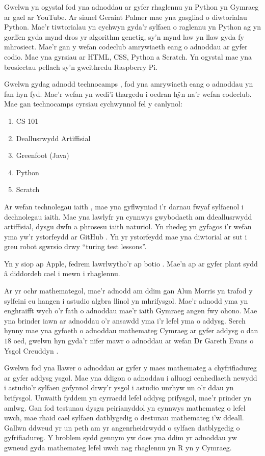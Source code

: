 Gwelwn yn ogystal fod yna adnoddau ar gyfer rhaglennu yn Python yn Gymraeg ar gael ar YouTube. Ar sianel Geraint Palmer \cite{youtube} mae yna gasgliad o diwtorialau Python. Mae'r tiwtorialau yn cychwyn gyda'r sylfaen o raglennu yn Python ag yn gorffen gyda mynd dros yr algorithm genetig, sy'n mynd law yn llaw gyda fy mhrosiect.
Mae'r gan y wefan codeclub amrywiaeth eang o adnoddau ar gyfer codio. Mae yna gyrsiau ar HTML, CSS, Python a Scratch. Yn ogystal mae yna brosiectau pellach sy'n gweithredu Raspberry Pi. 

Gwelwn gydag adnodd technocamps \cite{technocamps}, fod yna amrywiaeth eang o adnoddau yn fan hyn fyd. Mae'r wefan yn wedi'i thargedu i oedran h\^{y}n na'r wefan codeclub. Mae gan technocamps cyrsiau cychwynnol fel y canlynol:

\begin{enumerate}
	\item CS 101
	\item Deallusrwydd Artiffisial
	\item Greenfoot (Java)
	\item Python
	\item Scratch
\end{enumerate} 

Ar wefan technolegau iaith \cite{technolegau-iaith}, mae yna gyflwyniad i'r darnau fwyaf sylfaenol i dechnolegau iaith. Mae yna lawlyfr yn cynnwys gwybodaeth am ddeallusrwydd artiffisial, dysgu dwfn a phrosesu iaith naturiol. Yn rhedeg yn gyfagos i'r wefan yma yw'r ystorfeydd ar GitHub \cite{github-technolegauiaith}. Yn yr ystorfeydd mae yna diwtorial ar sut i greu robot sgwrsio drwy ``turing test lessons''. %

Yn y siop ap Apple, fedrem lawrlwytho'r ap botio \cite{botio}. Mae'n ap ar gyfer plant sydd \^{a} diddordeb cael i mewn i rhaglennu.

Ar yr ochr mathemategol, mae'r adnodd am ddim gan Alun Morris \cite{Algebra-llinol} yn trafod y sylfeini eu hangen i astudio algbra llinol yn mhrifysgol. Mae'r adnodd yma yn enghraifft wych o'r fath o adnoddau mae'r iaith Gymraeg angen fwy ohono. Mae yna brinder iawn ar adnoddau o'r ansawdd yma i'r lefel yma o addysg.
Serch hynny mae yna gyfoeth o adnoddau mathemateg Cymraeg ar gyfer addysg o dan $18$ oed, gwelwn hyn gyda'r nifer mawr o adnoddau ar wefan Dr Gareth Evans o Ysgol Creuddyn \cite{mathemateg}.  


Gwelwn fod yna llawer o adnoddau ar gyfer y maes mathemateg a chyfrifiadureg ar gyfer addysg ysgol. Mae yna ddigon o adnoddau i alluogi cenhedlaeth newydd i astudio'r sylfaen gofynnol drwy'r ysgol i astudio unrhyw un o'r ddau yn brifysgol. Unwaith fyddem yn cyrraedd lefel addysg prifysgol, mae'r prinder yn amlwg. Gan fod testunau dysgu peirianyddol yn cynnwys mathemateg o lefel uwch, mae rhaid cael sylfaen datblygedig o destunau mathemateg i'w ddeall. Gallwn ddweud yr un peth am yr angenrheidrwydd o sylfaen datblygedig o gyfrifiadureg. Y broblem sydd gennym yw does yna ddim yr adnoddau yw gwneud gyda mathemateg lefel uwch nag rhaglennu yn R yn y Cymraeg.


